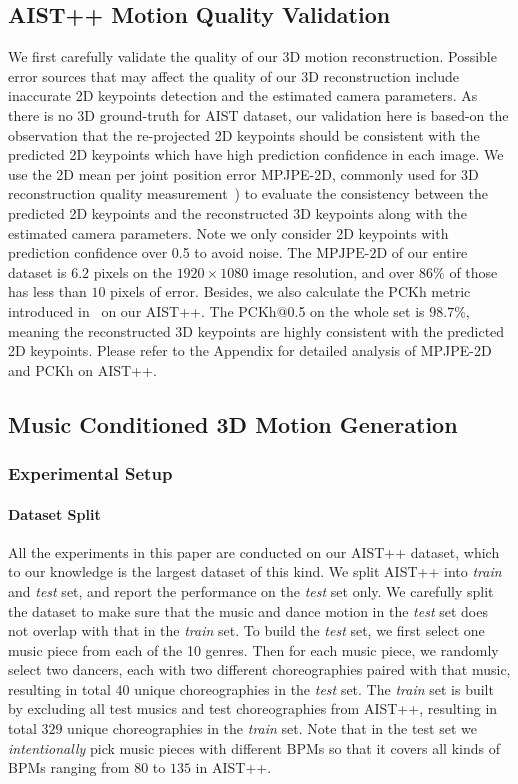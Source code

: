 \subsection{AIST++ Motion Quality Validation}
\label{sec:motion_eval}
We first carefully validate the quality of our 3D motion reconstruction. 
Possible error sources that may affect the quality of our 3D reconstruction include inaccurate 2D keypoints detection and the estimated camera parameters.
As there is no 3D ground-truth for AIST dataset, our validation here is based-on the observation that the re-projected 2D keypoints should be consistent with the predicted 2D keypoints which have high prediction confidence in each image. 
We use the 2D mean per joint position error MPJPE-2D, commonly used for 3D reconstruction quality measurement~\cite{kocabas2019vibe, h36m_pami, multiviewpose}) to evaluate the consistency between the predicted 2D keypoints and the reconstructed 3D keypoints along with the estimated camera parameters. 
Note we only consider 2D keypoints with prediction confidence over 0.5 to avoid noise. 
The $\text{MPJPE-2D}$ of our entire dataset is $6.2$ pixels on the $1920\times1080$ image resolution, and over $86\%$ of those has less than $10$ pixels of error. 
Besides, we also calculate the PCKh metric introduced in~\cite{andriluka20142d} on our AIST++. The PCKh@0.5 on the whole set is $98.7\%$, meaning the reconstructed 3D keypoints are highly consistent with the predicted 2D keypoints. 
Please refer to the Appendix for detailed analysis of MPJPE-2D and PCKh on AIST++.

\subsection{Music Conditioned 3D Motion Generation}

\subsubsection{Experimental Setup}
\paragraph{Dataset Split}
All the experiments in this paper are conducted on our AIST++ dataset, which to our knowledge is the largest dataset of this kind. We split AIST++ into \emph{train} and \emph{test} set, and report the performance on the \emph{test} set only. We carefully split the dataset to make sure that the music and dance motion in the \emph{test} set does not overlap with that in the \emph{train} set. 
To build the \emph{test} set, we first select one music piece from each of the 10 genres. Then for each music piece, we randomly select two dancers, each with two different choreographies paired with that music, resulting in total $40$ unique choreographies in the \emph{test} set. The \emph{train} set is built by excluding all test musics and test choreographies from AIST++, resulting in total $329$ unique choreographies in the \emph{train} set. Note that in the test set we \textit{intentionally} pick music pieces with different BPMs so that it covers all kinds of BPMs ranging from $80$ to $135$ in AIST++.  

